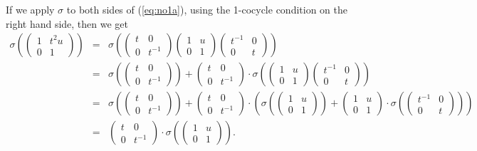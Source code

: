 If we apply $\sigma$ to both sides of (\ref{eq:no1a}), using the 1-cocycle condition on the right hand side, then we get
\begin{eqnarray*}
\sigma\left(
	\left(\begin{matrix} 1 & t^2u \\ 0 & 1\end{matrix}\right)
\right) &=&
\sigma\left(
	\left(\begin{matrix} t & 0 \\ 0 & t^{-1}  \end{matrix}\right) 
	\left(\begin{matrix} 1 & u \\ 0 & 1 \end{matrix}\right) 
	\left(\begin{matrix}  t^{-1} & 0 \\ 0 & t \end{matrix}\right)
\right) 
\\
&=&
\sigma\left(
	\left(\begin{matrix} t & 0 \\ 0 & t^{-1}  \end{matrix}\right) 
\right) +
\left(\begin{matrix} t & 0 \\ 0 & t^{-1}  \end{matrix}\right) \cdot
\sigma\left(
	\left(\begin{matrix} 1 & u \\ 0 & 1 \end{matrix}\right) 
	\left(\begin{matrix}  t^{-1} & 0 \\ 0 & t \end{matrix}\right)
\right) 
\\
&=& 
\sigma\left(
	\left(\begin{matrix} t & 0 \\ 0 & t^{-1}  \end{matrix}\right) 
\right) +
\left(\begin{matrix} t & 0 \\ 0 & t^{-1}  \end{matrix}\right) \cdot
\left(
	\sigma\left(
		\left(\begin{matrix} 1 & u \\ 0 & 1 \end{matrix}\right) 
	\right) +
	\left(\begin{matrix} 1 & u \\ 0 & 1 \end{matrix}\right) \cdot
	\sigma\left(
		\left(\begin{matrix}  t^{-1} & 0 \\ 0 & t \end{matrix}\right)
	\right)
\right)
\\
&=& 
\left(\begin{matrix} t & 0 \\ 0 & t^{-1}  \end{matrix}\right) \cdot
\sigma\left(
	\left(\begin{matrix} 1 & u \\ 0 & 1 \end{matrix}\right) 
\right).
\end{eqnarray*}
